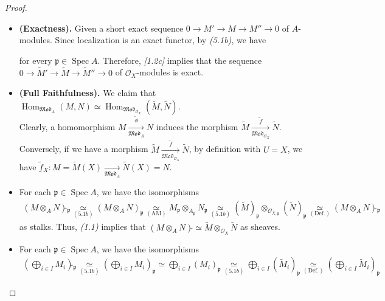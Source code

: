 \documentclass[11pt,a4paper,footinclude=true,headinclude=true]{scrbook} %
\DeclareMathOperator{\Spec}{Spec}
\DeclareMathOperator{\Hom}{Hom}
\newcommand{\OO}{\mathcal{O}}
\newcommand{\pp}{\mathfrak{p}}
\newcommand{\<}{\langle}
\newcommand{\>}{\rangle}
\newcommand{\MOD}{\mathfrak{Mod}}
\begin{document}
\begin{proof}\mbox{}
    \begin{itemize}
        \item[(a)] \textbf{(Exactness).} Given a short exact sequence $0\to M'\to M\to M''\to0$ of $A$-modules. Since localization is an exact functor, by \textit{(5.1b)}, we have
        \begin{center}
        \end{center}
        for every $\pp\in\Spec A$. Therefore, \textit{[1.2c]} implies that the sequence $0\to\widetilde{M}'\to\widetilde{M}\to\widetilde{M}''\to0$ of $\OO_X$-modules is exact.
        \item[(a)] \textbf{(Full Faithfulness).} We claim that $\Hom_{\MOD_A}(M,N)\simeq\Hom_{\MOD_{\OO_X}}(\widetilde{M},\widetilde{N})$.\\
        Clearly, a homomorphism $M\xrightarrow[\MOD_A]{\tilde{\phi}}N$ induces the morphism $\widetilde{M}\xrightarrow[\MOD_{\OO_X}]{\tilde{f}}\widetilde{N}$. Conversely, if we have a morphism $\widetilde{M}\xrightarrow[\MOD_{\OO_X}]{\tilde{f}}\widetilde{N}$, by definition with $U=X$, we have $\tilde{f}_X:M=\widetilde{M}(X)\xrightarrow[\MOD_A]{}\widetilde{N}(X)=N$.
        \item[(b)] For each $\pp\in\Spec A$, we have the isomorphisms
        \begin{align*}
            (M\otimes_AN)\widetilde{}_\pp
            \underset{(5.1b)}{\simeq} (M\otimes_AN)_\pp
            \underset{(\text{AM})}{\simeq}M_\pp\otimes_{A_\pp}N_\pp \underset{(5.1b)}{\simeq}(\widetilde{M})_\pp\otimes_{\OO_{X,\pp}}(\widetilde{N})_\pp
            \underset{(\text{Def.})}{\simeq}(M\otimes_AN)\widetilde{}_\pp
        \end{align*}
        as stalks. Thus, \textit{(1.1)} implies that $(M\otimes_AN)\widetilde{}\simeq\widetilde{M}\otimes_{\OO_X}\widetilde{N}$ as sheaves.
        \item[(c)] For each $\pp\in\Spec A$, we have the isomorphisms
        \begin{align*}
            (\bigoplus_{i\in I}M_i)\widetilde{}_\pp\underset{(5.1b)}{\simeq}(\bigoplus_{i\in I}M_i)_\pp\simeq\bigoplus_{i\in I}(M_i)_\pp\underset{(5.1b)}{\simeq}\bigoplus_{i\in I}(\widetilde{M}_i)_\pp\underset{(\text{Def.})}{\simeq}(\bigoplus_{i\in I}\widetilde{M}_i)_\pp

\end{align*}
\end{itemize}
\end{proof}
\end{document}
